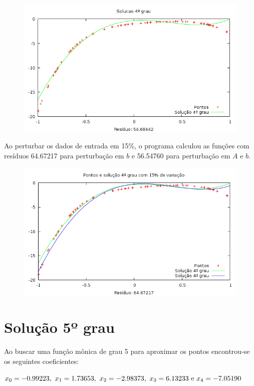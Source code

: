 \begin{figure}[h]
\centering
\includegraphics[scale=0.7]{sol4grau}
\end{figure}
Ao perturbar os dados de entrada em 15\%, o programa calculou as funções 
com resíduos 64.67217 para perturbação em $b$ e 56.54760  para perturbação em $A$ e $b$.
\begin{figure}[h]
\centering
\includegraphics[scale=0.7]{sol4grau_var}
\end{figure}

\newpage
\section{Solução 5º grau}

Ao buscar uma função mônica de grau 5 para aproximar os pontos encontrou-se os seguintes 
coeficientes:

\(x_0 = -0.99223,~    x_1 = 1.73653,~x_2 = -2.98373,~ x_3 = 6.13233 ~$e$~ x_4 =  -7.05190 \)

